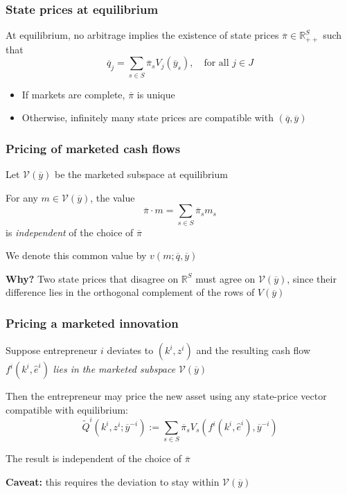 \documentclass[blue]{beamer}
\def\R{\mathbb{R}}
\theoremstyle{definition}
\theoremstyle{example}
\begin{document}
\begin{frame}\frametitle{State prices at equilibrium}
At equilibrium, no arbitrage implies the existence of state prices $\overline{\pi} \in \R_{++}^S$ such that
\begin{equation*}
\overline{q}_j = \sum_{s \in S} \overline{\pi}_s V_j(\overline{y}_s), \quad \text{for all $j \in J$}
\end{equation*}
\bigskip

\begin{itemize}
\item If markets are complete, $\overline{\pi}$ is unique
\item Otherwise, infinitely many state prices are compatible with $(\overline{q}, \overline{y})$
\end{itemize}
\end{frame}

\begin{frame}\frametitle{Pricing of marketed cash flows}
Let $\mathcal{V}(\overline{y})$ be the marketed subspace at equilibrium
\bigskip

For any $m \in \mathcal{V}(\overline{y})$, the value
\begin{equation*}
\overline{\pi} \cdot m = \sum_{s \in S} \overline{\pi}_s m_s
\end{equation*}
is \emph{independent} of the choice of $\overline{\pi}$
\bigskip

We denote this common value by $v(m; \overline{q}, \overline{y})$
\bigskip

\textbf{Why?} Two state prices that disagree on $\R^S$ must agree on $\mathcal{V}(\overline{y})$, since their difference lies in the orthogonal complement of the rows of $V(\overline{y})$
\end{frame}

\begin{frame}\frametitle{Pricing a marketed innovation}
Suppose entrepreneur $i$ deviates to $(k^i, z^i)$ and the resulting cash flow $f^i(k^i, \widehat{e}^i)$ \emph{lies in the marketed subspace} $\mathcal{V}(\overline{y})$
\bigskip

Then the entrepreneur may price the new asset using any state-price vector compatible with equilibrium:
\begin{equation*}
\widetilde{Q}^i(k^i, z^i; \overline{y}^{-i}) := \sum_{s \in S} \overline{\pi}_s V_s(f^i(k^i, \widehat{e}^i), \overline{y}^{-i})
\end{equation*}
\bigskip

The result is independent of the choice of $\overline{\pi}$
\bigskip

\textbf{Caveat:} this requires the deviation to stay within $\mathcal{V}(\overline{y})$
\end{frame}
\end{document}
